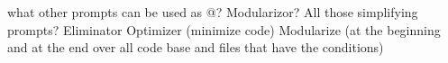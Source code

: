 what other prompts can be used as @? 
    \n
    Modularizor?
        All those simplifying prompts?
            Eliminator
            Optimizer (minimize code)
            Modularize (at the beginning and at the end over all code base and files that have the conditions)
